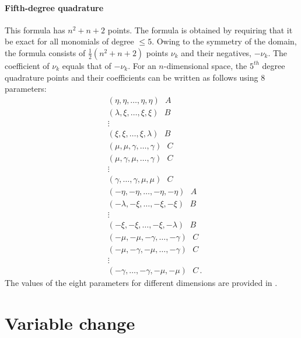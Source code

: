 \documentclass{article}
\begin{document}
\paragraph{Fifth-degree quadrature} This formula has $n^2 + n + 2$ points. The formula is obtained by requiring that it be exact for all monomials of degree $\leq 5$. Owing to the symmetry of the domain, the formula consists of $\frac{1}{2}(n^2 + n +2)$ points $\nu_k$ and their negatives, $-\nu_k$. The coefficient of $\nu_k$ equals that of $-\nu_k$. For an $n$-dimensional space, the $5^{th}$ degree quadrature points and their coefficients can be written as follows using 8 parameters:
\begin{equation}
\begin{split}
    & (\eta, \eta, \ldots, \eta, \eta) \,\,\,\, A \\
    & (\lambda, \xi, \ldots, \xi, \xi) \,\,\,\, B  \\
    & \vdots \\
    & (\xi, \xi, \ldots, \xi, \lambda) \,\,\,\, B  \\
    & (\mu, \mu, \gamma, \ldots, \gamma) \,\,\,\, C  \\
    & (\mu, \gamma, \mu, \ldots, \gamma) \,\,\,\,C  \\
    & \vdots \nonumber \\
    & (\gamma, \ldots, \gamma, \mu, \mu) \,\,\,\, C \\
    & (-\eta, -\eta, \ldots, -\eta, -\eta) \,\,\,\, A  \\
    & (-\lambda, -\xi, \ldots, -\xi, -\xi) \,\,\,\, B \\
    & \vdots \\
    & (-\xi, -\xi, \ldots, -\xi, -\lambda) \,\,\,\, B  \\
    & (-\mu, -\mu, -\gamma, \ldots, -\gamma) \,\,\,\, C  \\
    & (-\mu, -\gamma, -\mu, \ldots, -\gamma) \,\,\,\, C  \\
    & \vdots \\
    & (-\gamma, \ldots, -\gamma, -\mu, -\mu) \,\,\,\, C\,.
\end{split}
\end{equation}
The values of the eight parameters for different dimensions are provided in \cite{stroud1966some,stroud1967some}.

\section{Variable change}
\label{sec:Variable change}
\end{document}
